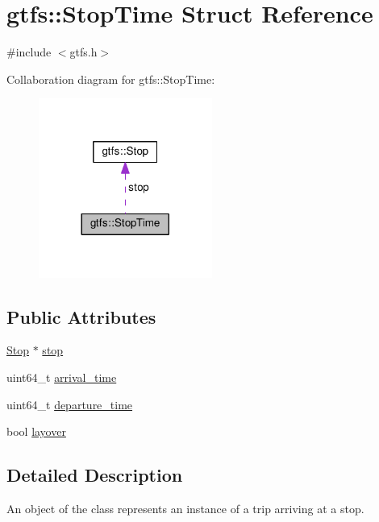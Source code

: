 \hypertarget{structgtfs_1_1StopTime}{}\section{gtfs\+:\+:Stop\+Time Struct Reference}
\label{structgtfs_1_1StopTime}


{\ttfamily \#include $<$gtfs.\+h$>$}



Collaboration diagram for gtfs\+:\+:Stop\+Time\+:
\nopagebreak
\begin{figure}[H]
\begin{center}
\leavevmode
\includegraphics[width=161pt]{structgtfs_1_1StopTime__coll__graph}
\end{center}
\end{figure}
\subsection*{Public Attributes}
\begin{DoxyCompactItemize}
\item 
\hyperlink{classgtfs_1_1Stop}{Stop} $\ast$ \hyperlink{structgtfs_1_1StopTime_a258bc40f919b9d804797d7d75f0c0eca}{stop}
\item 
uint64\+\_\+t \hyperlink{structgtfs_1_1StopTime_a121c4634f247313bb598e7dfc2bebe91}{arrival\+\_\+time}
\item 
uint64\+\_\+t \hyperlink{structgtfs_1_1StopTime_ad9059c8a036e22b917870bd6e6457f4b}{departure\+\_\+time}
\item 
bool \hyperlink{structgtfs_1_1StopTime_af8cc780329a837a49a5d6af60b74b9bf}{layover}
\end{DoxyCompactItemize}


\subsection{Detailed Description}
An object of the class represents an instance of a trip arriving at a stop.

